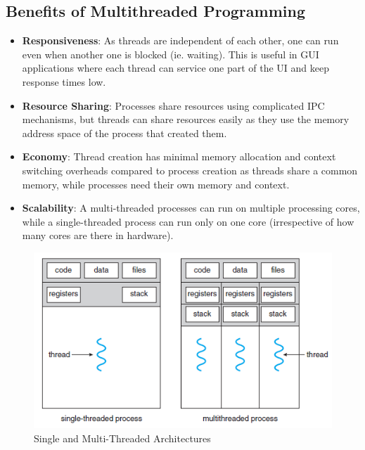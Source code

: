 \documentclass{article}
\theoremstyle{plain}
\theoremstyle{definition}
\begin{document}
\subsection{Benefits of Multithreaded Programming}
\begin{itemize}
    \item \textbf{Responsiveness}: As threads are independent of each other, one can run even when another one is blocked (ie. waiting). This is useful in GUI applications where each thread can service one part of the UI and keep response times low. 
    
    \item \textbf{Resource Sharing}: Processes share resources using complicated IPC mechanisms, but threads can share resources easily as they use the memory address space of the process that created them. 
    
    \item \textbf{Economy}: Thread creation has minimal memory allocation and context switching overheads compared to process creation as threads share a common memory, while processes need their own memory and context.
    
    \item \textbf{Scalability}: A multi-threaded processes can run on multiple processing cores, while a single-threaded process can run only on one core (irrespective of how many cores are there in hardware). 
\end{itemize}
\begin{figure}
    \centering
    \includegraphics{os.png}
    \caption{Single and Multi-Threaded Architectures}
    \label{fig:my_label}
\end{figure}
\end{document}
